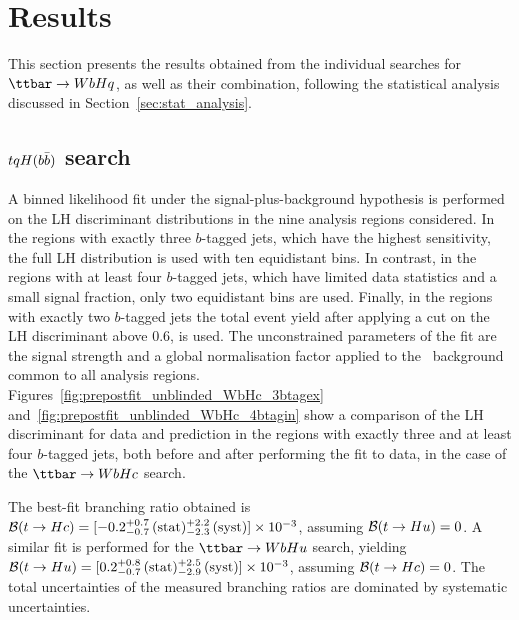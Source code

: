 \section{Results}
\label{sec:result}

This section presents the results obtained from the individual searches for $\Hq$, as well as their combination,
following the statistical analysis discussed in Section~\ref{sec:stat_analysis}.

\subsection{$tqH(b\bar{b})$ search}
\label{sec:results_Hbb}

A binned likelihood fit under the signal-plus-background hypothesis 
is performed on the LH discriminant distributions in the nine analysis regions considered.
In the regions with exactly three $b$-tagged jets, which have the highest sensitivity, the full LH distribution is used with ten equidistant bins. 
In contrast, in the regions with at least four $b$-tagged jets,
which have limited data statistics and a small signal fraction, only two equidistant bins are used. Finally, in the regions with exactly two $b$-tagged jets 
the total event yield after applying a cut on the LH discriminant above 0.6, is used. 
The unconstrained parameters of the fit are the signal strength and a global normalisation factor applied to the \ttbin\ background 
common to all analysis regions.
Figures~\ref{fig:prepostfit_unblinded_WbHc_3btagex} and~\ref{fig:prepostfit_unblinded_WbHc_4btagin} show a comparison of the LH discriminant for 
data and prediction in the regions with exactly three and at least four $b$-tagged jets, 
both before and after performing the fit to data, in the case of the $\Hc$ search.  

The best-fit branching ratio obtained is $\mathcal{B}(t\to Hc)=[-0.2^{+0.7}_{-0.7}\,(\mathrm{stat})^{+2.2}_{-2.3}\,(\mathrm{syst})] \times 10^{-3}$,
assuming $\mathcal{B}(t\to Hu)=0$. 
A similar fit is performed for the $\Hu$ search, yielding $\mathcal{B}(t\to Hu)=[0.2^{+0.8}_{-0.7}\,(\mathrm{stat})^{+2.5}_{-2.9}\,(\mathrm{syst})] \times 10^{-3}$,
assuming $\mathcal{B}(t\to Hc)=0$.  
The total uncertainties of the measured branching ratios are dominated by systematic uncertainties.

